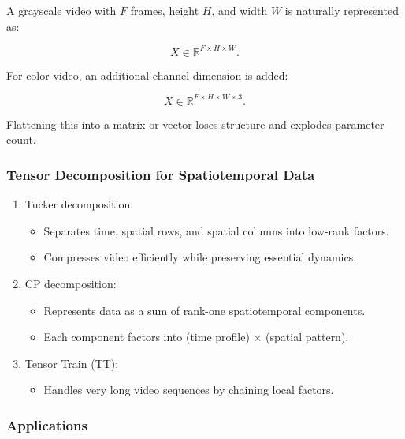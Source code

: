 \documentclass[
  letterpaper,
  DIV=11,
  numbers=noendperiod]{scrreprt}
\providecommand{\tightlist}{%
  \setlength{\itemsep}{0pt}\setlength{\parskip}{0pt}}
\begin{document}
A grayscale video with \(F\) frames, height \(H\), and width \(W\) is
naturally represented as:

\[
X \in \mathbb{R}^{F \times H \times W}.
\]

For color video, an additional channel dimension is added:

\[
X \in \mathbb{R}^{F \times H \times W \times 3}.
\]

Flattening this into a matrix or vector loses structure and explodes
parameter count.

\subsubsection{Tensor Decomposition for Spatiotemporal
Data}\label{tensor-decomposition-for-spatiotemporal-data}

\begin{enumerate}
\def\labelenumi{\arabic{enumi}.}
\item
  Tucker decomposition:

  \begin{itemize}
  \tightlist
  \item
    Separates time, spatial rows, and spatial columns into low-rank
    factors.
  \item
    Compresses video efficiently while preserving essential dynamics.
  \end{itemize}
\item
  CP decomposition:

  \begin{itemize}
  \tightlist
  \item
    Represents data as a sum of rank-one spatiotemporal components.
  \item
    Each component factors into (time profile) × (spatial pattern).
  \end{itemize}
\item
  Tensor Train (TT):

  \begin{itemize}
  \tightlist
  \item
    Handles very long video sequences by chaining local factors.
  \end{itemize}
\end{enumerate}

\subsubsection{Applications}\label{applications-6}
\end{document}
